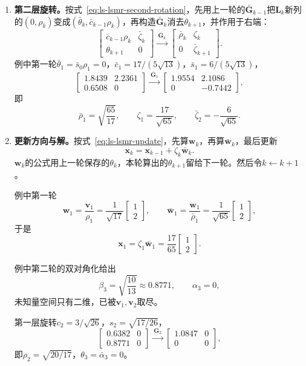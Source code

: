 \begin{enumerate}
 \item \textbf{第二层旋转。}按式~\eqref{eq:ls-lsmr-second-rotation}，先用上一轮的$\bar{\bm G}_{k-1}$把$\bm L_k$新列的$(0,\rho_k)$变成$(\bar\theta_k,\bar c_{k-1}\rho_k)$，再构造$\bar{\bm G}_k$消去$\theta_{k+1}$，并作用于右端：
 \[
  \begin{bmatrix}\bar c_{k-1}\rho_k&\bar\zeta_k\\\theta_{k+1}&0\end{bmatrix}
  \xrightarrow{\ \bar{\bm G}_k\ }
  \begin{bmatrix}\bar\rho_k&\zeta_k\\0&\bar\zeta_{k+1}\end{bmatrix}.
 \]
 例中第一轮$\bar\theta_1=\bar s_0\rho_1=0$，$\bar c_1=17/(5\sqrt{13})$，$\bar s_1=6/(5\sqrt{13})$，
 \[
  \begin{bmatrix}1.8439&2.2361\\0.6508&0\end{bmatrix}
  \xrightarrow{\ \bar{\bm G}_1\ }
  \begin{bmatrix}1.9554&2.1086\\0&-0.7442\end{bmatrix},
 \]
 即
 \[
  \bar\rho_1=\sqrt{\frac{65}{17}},\qquad \zeta_1=\frac{17}{\sqrt{65}},\qquad \bar\zeta_2=-\frac6{\sqrt{65}} .
 \]

 \item \textbf{更新方向与解。}按式~\eqref{eq:ls-lsmr-update}，先算$\bm w_k$，再算$\bar{\bm w}_k$，最后更新
 \[
  \bm x_k=\bm x_{k-1}+\zeta_k\bar{\bm w}_k .
 \]
 $\bm w_k$的公式用上一轮保存的$\theta_k$，本轮算出的$\theta_{k+1}$留给下一轮。然后令$k\leftarrow k+1$。

 例中第一轮
 \[
  \bm w_1=\frac{\bm v_1}{\rho_1}=\frac1{\sqrt{17}}\begin{bmatrix}1\\2\end{bmatrix},\qquad
  \bar{\bm w}_1=\frac{\bm w_1}{\bar\rho_1}=\frac1{\sqrt{65}}\begin{bmatrix}1\\2\end{bmatrix},
 \]
 于是
 \[
  \bm x_1=\zeta_1\bar{\bm w}_1=\frac{17}{65}\begin{bmatrix}1\\2\end{bmatrix}.
 \]

 例中第二轮的双对角化给出
 \[
  \beta_3=\sqrt{\frac{10}{13}}\approx0.8771,\qquad \alpha_3=0 ,
 \]
 未知量空间只有二维，已被$\bm v_1,\bm v_2$取尽。

 第一层旋转$c_2=3/\sqrt{26}$，$s_2=\sqrt{17/26}$，
 \[
  \begin{bmatrix}0.6382&0\\0.8771&0\end{bmatrix}
  \xrightarrow{\ \bm G_2\ }
  \begin{bmatrix}1.0847&0\\0&0\end{bmatrix},
 \]
 即$\rho_2=\sqrt{20/17}$，$\theta_3=\bar\alpha_3=0$。


\end{enumerate}
